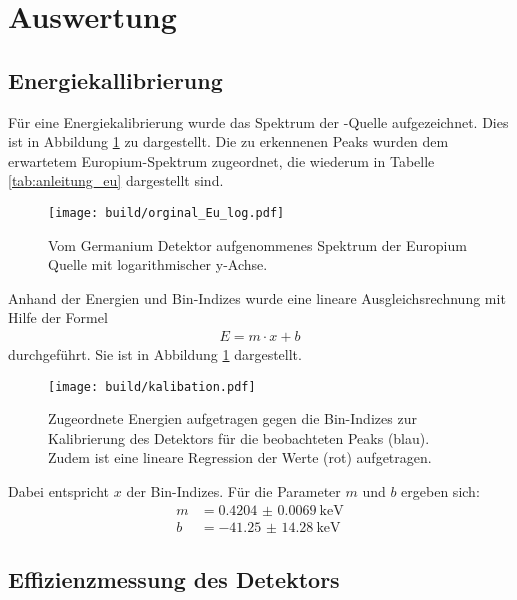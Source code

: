 \newpage
\section{Auswertung}
\label{sec:Auswertung}

\subsection{Energiekallibrierung}
\label{sec:Energiekallibrierung}

Für eine Energiekalibrierung wurde das Spektrum der -Quelle
aufgezeichnet. Dies ist in Abbildung \ref{plt:Eu-Spektrum} zu dargestellt. Die zu
erkennenen Peaks wurden dem erwartetem Europium-Spektrum zugeordnet,
die wiederum in Tabelle \ref{tab:anleitung_eu} dargestellt sind.
\begin{figure}[htb]
    \centering
    \texttt{[image: build/orginal\_Eu\_log.pdf]}
  \caption{Vom Germanium Detektor aufgenommenes Spektrum der Europium Quelle mit
  logarithmischer y-Achse.}
  \label{plt:Eu-Spektrum}
\end{figure}
Anhand der Energien und Bin-Indizes wurde eine lineare Ausgleichsrechnung
mit Hilfe der Formel
\begin{align*}
  E = m \cdot x + b
\end{align*}
durchgeführt. Sie ist in Abbildung \ref{plt:Eu-Spektrum} dargestellt.
\begin{figure}[htb]
  \centering
  \texttt{[image: build/kalibation.pdf]}
  \caption{Zugeordnete Energien aufgetragen gegen die Bin-Indizes zur
  Kalibrierung des Detektors für die beobachteten Peaks (blau). Zudem ist eine
  lineare Regression der Werte (rot) aufgetragen.}
  \label{plt:eichung}
\end{figure}
Dabei entspricht $x$ der Bin-Indizes. Für die Parameter $m$ und
$b$ ergeben sich:
\begin{align*}
	m &= \SI{0.4204(69)}{\kilo\electronvolt} \\
  b &= \SI{-41.25(1428)}{\kilo\electronvolt}
\end{align*}

\FloatBarrier

\subsection{Effizienzmessung des Detektors}
\label{sec:Effizienzmessung}

